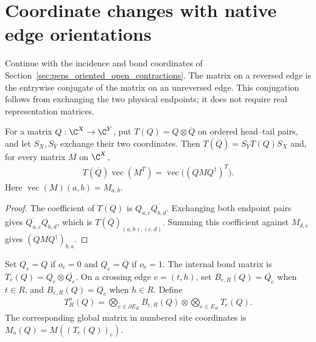 \section{Coordinate changes with native edge orientations}
\label{sec:peps_oriented_coordinate_transport}

Continue with the incidence and bond coordinates of
Section~\ref{sec:peps_oriented_open_contractions}. The matrix on a reversed
edge is the entrywise conjugate of the matrix on an unreversed edge.
This conjugation follows from exchanging the two physical endpoints;
it does not require real representation matrices.

\begin{lemma}%
    \label{thm:peps_oriented_coordinate_swap}
    \leanok
    For a matrix $Q:\C^X\to\C^Y$, put $T(Q)=Q\otimes\overline Q$
    on ordered head--tail pairs, and let $S_X,S_Y$ exchange their
    two coordinates. Then $T(\overline Q)=S_YT(Q)S_X$ and, for every
    matrix $M$ on $\C^X$,
    \begin{align}
        T(\overline Q)\operatorname{vec}(M^T)
        =\operatorname{vec}\bigl((QMQ^\dagger)^T\bigr).
        \label{eq:peps_oriented_transposed_coordinate}
    \end{align}
    Here $\operatorname{vec}(M)(a,b)=M_{a,b}$.
\end{lemma}
\begin{proof}\leanok
    The coefficient of $T(Q)$ is $Q_{a,c}\overline{Q_{b,d}}$.
    Exchanging both endpoint pairs gives
    $\overline{Q_{a,c}}Q_{b,d}$, which is $T(\overline Q)_{(a,b),(c,d)}$.
    Summing this coefficient against $M_{d,c}$ gives
    $(QMQ^\dagger)_{b,a}$.
\end{proof}

\begin{definition}%
    \label{def:peps_oriented_coordinate_matrix}
    \leanok
    Set $Q_e=Q$ if $o_e=0$ and $Q_e=\overline Q$ if $o_e=1$.
    The internal bond matrix is $T_e(Q)=Q_e\otimes\overline{Q_e}$.
    On a crossing edge $e=(t,h)$, set $B_{e,R}(Q)=\overline{Q_e}$
    when $t\in R$, and $B_{e,R}(Q)=Q_e$ when $h\in R$.
    Define
    \begin{align}
        T_R^o(Q)=
        \bigotimes_{e\in\partial E_R}B_{e,R}(Q)
        \otimes\bigotimes_{e\in E_R}T_e(Q).
        \label{eq:peps_oriented_regional_coordinate}
    \end{align}
    The corresponding global matrix in numbered site coordinates is
    $M_o(Q)=M((T_e(Q))_e)$.
\end{definition}

